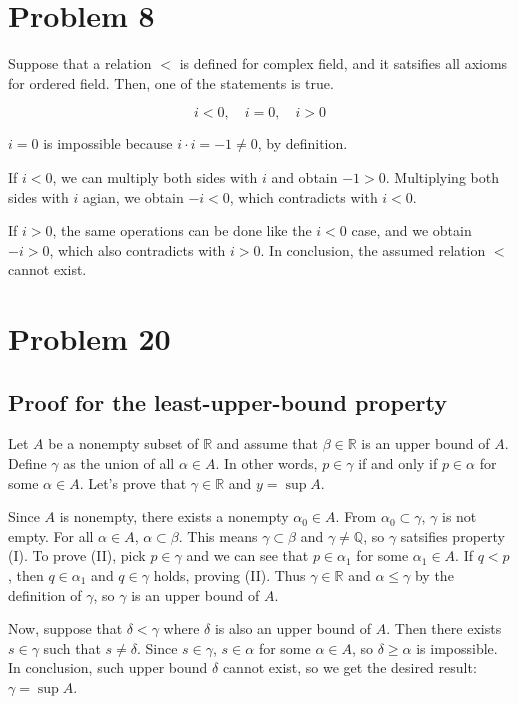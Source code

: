 \documentclass{scrartcl}
\begin{document}
\section{Problem 8}
Suppose that a relation \(<\) is defined for complex field, and it satsifies all axioms for ordered field. Then, one of the statements is true.

\[
  i < 0, \quad i = 0, \quad i > 0
\]

\(i = 0\) is impossible because \(i \cdot i = -1 \not = 0\), by definition.

If \(i < 0\), we can multiply both sides with \(i\) and obtain \(-1 > 0\).
Multiplying both sides with \(i\) agian, we obtain \(-i < 0\), which contradicts with \(i < 0\).

If \(i > 0\), the same operations can be done like the \(i < 0\) case, and we obtain \(-i > 0\), which also contradicts with \(i > 0\).
In conclusion, the assumed relation \(<\) cannot exist.

\section{Problem 20}
\subsection{Proof for the least-upper-bound property}
Let \(A\) be a nonempty subset of \(\mathbb{R}\) and assume that \(\beta \in \mathbb{R}\) is an upper bound of \(A\).
Define \(\gamma\) as the union of all \(\alpha \in A\).
In other words, \(p \in \gamma\) if and only if \(p \in \alpha\) for some \(\alpha \in A\).
Let's prove that \(\gamma \in \mathbb{R}\) and \(y = \sup A\).

Since \(A\) is nonempty, there exists a nonempty \(\alpha_0 \in A\).
From \(\alpha_0 \subset \gamma\), \(\gamma\) is not empty.
For all \(\alpha \in A\), \(\alpha \subset \beta\).
This means \(\gamma \subset \beta\) and \(\gamma \not = \mathbb{Q}\), so \(\gamma\) satsifies property (I).
To prove (II), pick \(p \in \gamma\) and we can see that \(p \in \alpha_1\) for some \(\alpha_1 \in A\).
If \(q < p\), then \(q \in \alpha_1\) and \(q \in \gamma\) holds, proving (II).
Thus \(\gamma \in \mathbb{R}\) and \(\alpha \leq \gamma\) by the definition of \(\gamma\), so \(\gamma\) is an upper bound of \(A\).

Now, suppose that \(\delta < \gamma\) where \(\delta\) is also an upper bound of \(A\).
Then there exists \(s \in \gamma\) such that \(s \not = \delta\).
Since \(s \in \gamma\), \(s \in \alpha\) for some \(\alpha \in A\), so \(\delta \geq \alpha\) is impossible.
In conclusion, such upper bound \(\delta\) cannot exist, so we get the desired result: \(\gamma = \sup A\).
\end{document}
